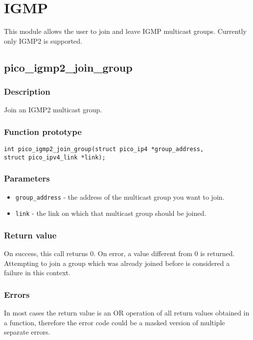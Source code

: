 \section{IGMP}

This module allows the user to join and leave IGMP multicast groups. Currently only IGMP2 is supported.


\subsection{pico\_igmp2\_join\_group}

\subsubsection*{Description}
Join an IGMP2 multicast group.

\subsubsection*{Function prototype}
\begin{verbatim}
int pico_igmp2_join_group(struct pico_ip4 *group_address,
struct pico_ipv4_link *link);
\end{verbatim}

\subsubsection*{Parameters}
\begin{itemize}[noitemsep]
\item \texttt{group\_address} - the address of the multicast group you want to join.
\item \texttt{link} - the link on which that multicast group should be joined.
\end{itemize}

\subsubsection*{Return value}
On success, this call returns 0.
On error, a value different from 0 is returned.
Attempting to join a group which was already joined before is considered a failure in this context.

\subsubsection*{Errors}
In most cases the return value is an OR operation of all return values obtained in a function,
therefore the error code could be a masked version of multiple separate errors.

